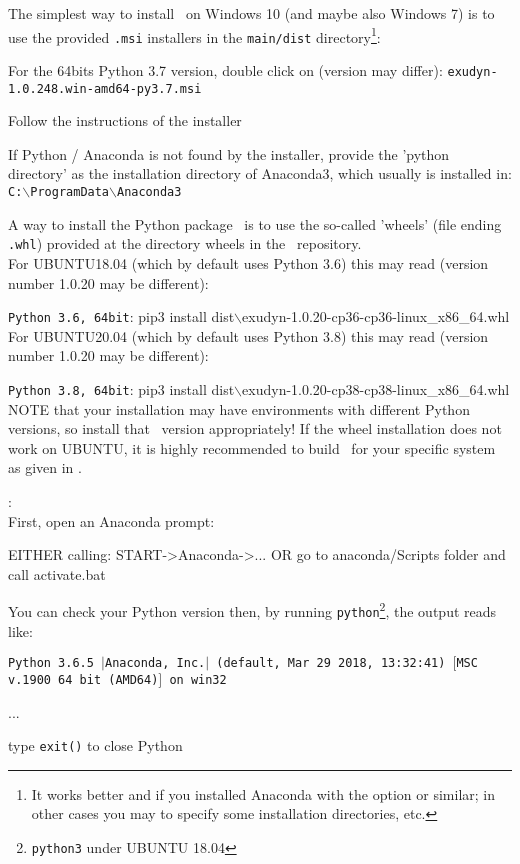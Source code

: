 The simplest way to install \codeName\ on Windows 10 (and maybe also Windows 7) is to use the provided \texttt{.msi} installers in the \texttt{main/dist} directory\footnote{It works better  and if you installed Anaconda with the option  or similar; in other cases you may to specify some installation directories, etc.}:
\bi
  \item For the 64bits Python 3.7 version, double click on (version may differ):\ignoreRST{\\} \texttt{exudyn-1.0.248.win-amd64-py3.7.msi}
  \item Follow the instructions of the installer
  \item If Python / Anaconda is not found by the installer, provide the 'python directory' as the installation directory of Anaconda3, which usually is installed in:\\
  \texttt{C:$\backslash$ProgramData$\backslash$Anaconda3}
\ei

A way to install the Python package \codeName\ is to use the so-called 'wheels' (file ending \texttt{.whl}) provided at the directory wheels in the \codeName\ repository. 
\vspace{6pt}\\
For UBUNTU18.04 (which by default uses Python 3.6) this may read (version number 1.0.20 may be different):
\bi
  \item \texttt{Python 3.6, 64bit}: pip3 install dist$\backslash$exudyn-1.0.20-cp36-cp36-linux\_x86\_64.whl
\ei
For UBUNTU20.04 (which by default uses Python 3.8) this may read (version number 1.0.20 may be different):
\bi
  \item \texttt{Python 3.8, 64bit}: pip3 install dist$\backslash$exudyn-1.0.20-cp38-cp38-linux\_x86\_64.whl
\ei
NOTE that your installation may have environments with different Python versions, so install that \codeName\ version appropriately!
If the wheel installation does not work on UBUNTU, it is highly recommended to build \codeName\ for your specific system as given in .

\noindent {}:\vspace{6pt}\\
First, open an Anaconda prompt:
\bi
  \item EITHER calling: START->Anaconda->... OR go to anaconda/Scripts folder and call activate.bat
  \item You can check your Python version then, by running \texttt{python}\footnote{\texttt{python3} under UBUNTU 18.04}, the output reads like:
  \bi
    \item[] \texttt{Python 3.6.5 $|$Anaconda, Inc.$|$ (default, Mar 29 2018, 13:32:41) $[$MSC v.1900 64 bit (AMD64)$]$ on win32}
    \item[] ...
  \ei
  \item type \texttt{exit()} to close Python
\ei

